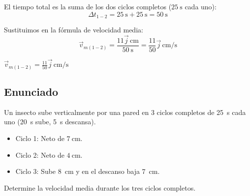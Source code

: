 \documentclass[12pt, a4paper]{article}
\begin{document}
El tiempo total es la suma de los dos ciclos completos ($\SI{25}{\second}$ cada uno):
\begin{equation}
    \Delta t_{1-2} = \SI{25}{\second} + \SI{25}{\second} = \SI{50}{\second}
\end{equation}

Sustituimos en la fórmula de velocidad media:
\begin{equation}
    \vec{v}_{m(1-2)} = \frac{11\vec{j} \, \si{\centi\metre}}{\SI{50}{\second}} = \frac{11}{50}\vec{j} \, \si{\centi\metre/\second}
\end{equation}

\begin{tcolorbox}[colback=green!5!white, colframe=green!50!black, title=Respuesta Final]
\centering \Large $\vec{v}_{m(1-2)} = \frac{11}{50}\vec{j} \, \si{\centi\metre/\second}$
\end{tcolorbox}

\newpage

\subsection*{Enunciado}
Un insecto sube verticalmente por una pared en 3 ciclos completos de \SI{25}{\second} cada uno (\SI{20}{\second} sube, \SI{5}{\second} descansa).
\begin{itemize}
    \item Ciclo 1: Neto de $\SI{7}{\centi\metre}$.
    \item Ciclo 2: Neto de $\SI{4}{\centi\metre}$.
    \item Ciclo 3: Sube \SI{8}{\centi\metre} y en el descanso baja \SI{7}{\centi\metre}.
\end{itemize}
Determine la velocidad media durante los tres ciclos completos.

\begin{center}
\end{center}
\end{document}
